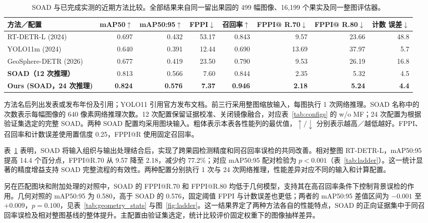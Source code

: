 \documentclass[11pt,a4paper]{ctexart}
\begin{document}
\begin{table}[H]
\centering
\scriptsize\setlength{\tabcolsep}{2.1pt}
\caption{SOAD 与已完成实测的近期方法比较。全部结果来自同一留出果园的 499 幅图像、16,199 个果实及同一整图评估器。}
\label{tab:main}
\begin{tabular}{lrrrrrrr}
\toprule
方法／配置 & mAP50$\uparrow$ & mAP50:95$\uparrow$ & FPPI$\downarrow$ & 召回率$\uparrow$ & \shortstack{FPPI@\\R.70$\downarrow$} & \shortstack{FPPI@\\R.80$\downarrow$} & \shortstack{计数\\误差$\downarrow$} \\
\midrule
RT-DETR-L (2024) \cite{rtdetr} & 0.697 & 0.432 & 53.17 & 0.843 & 9.57 & 23.66 & 48.8 \\
YOLO11m (2024) \cite{yolo11} & 0.640 & 0.391 & 12.44 & 0.690 & 13.69 & 37.97 & 5.7 \\
GeoSphere-DETR (2026) \cite{geosphere} & 0.677 & 0.419 & 23.50 & 0.790 & 9.53 & 26.19 & 16.8 \\
\midrule
\textbf{SOAD（12 次推理）} & 0.813 & 0.566 & 7.60 & 0.844 & 2.35 & 5.32 & 4.5 \\
\textbf{Ours (SOAD，24 次推理)} & \textbf{0.824} & \textbf{0.576} & \textbf{7.37} & \textbf{0.946} & \textbf{2.18} & \textbf{5.24} & \textbf{4.4} \\
\bottomrule
\end{tabular}
\par\vspace{2pt}\parbox{0.97\linewidth}{\footnotesize 方法名后列出发表或发布年份及引用；YOLO11 引用官方发布文档。前三行采用整图缩放输入，每图执行 1 次网络推理。SOAD 名称中的次数表示每幅图像的 640 像素网络推理次数。12 次配置保留证据校准、关闭镜像融合，对应表~\ref{tab:configs} 的 w/o MF；24 次配置为根据验证集选定的完整 SOAD。两种 SOAD 配置均采用图块输入。粗体表示本表各性能列的最优值，$\uparrow/\downarrow$ 分别表示越高／越低越好。FPPI、召回率和计数误差使用置信度 0.25，FPPI@R 使用固定召回率。}
\end{table}
表~\ref{tab:main} 表明，SOAD 将输入组织与输出处理结合后，实现了跨果园检测精度和同召回率误检的共同改善。相对整图 RT-DETR-L，mAP50:95 提高 14.4 个百分点，FPPI@R.70 从 9.57 降至 2.18，减少约 77.2\%；对应 mAP50:95 配对检验为 $p<0.001$（表~\ref{tab:ladder}）。这一统计显著的精度增益支持 SOAD 完整流程的有效性。两种配置分别执行 1 次与 24 次网络推理，性能差异对应不同的输入和计算配置。

另在匹配图块和附加处理的对照中，SOAD 的 FPPI@R.70 和 FPPI@R.80 均低于几何模型，支持其在高召回率条件下控制背景误检的作用。几何对照的 mAP50:95 为 0.580，高于 SOAD 的 0.576，固定阈值 FPPI 与计数误差也更低；两者的 mAP50:95 差值区间为 $-0.001$ 至 $+0.009$，$p=0.100$，见表~\ref{tab:geometry_stats} 与图~\ref{fig:ladder}。这一结果界定了两种方法各自的性能特点，SOAD 的正向证据集中于同召回率误检及相对整图基线的整体提升。主配置由验证集选定，统计比较评价固定权重下的图像抽样差异。
\end{document}
